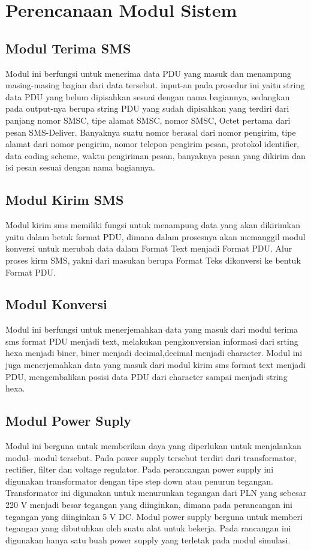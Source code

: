 \section{Perencanaan Modul Sistem}
\subsection{Modul Terima SMS}
Modul ini berfungsi untuk menerima data PDU yang masuk dan menampung masing-masing bagian dari data tersebut.
input-an pada prosedur ini yaitu string data PDU yang belum dipisahkan sesuai dengan nama bagiannya, sedangkan pada output-nya
berupa string PDU yang sudah dipisahkan yang terdiri dari panjang nomor SMSC, tipe alamat
SMSC, nomor SMSC, Octet pertama dari pesan SMS-Deliver. Banyaknya suatu nomor berasal dari nomor pengirim, tipe alamat dari nomor pengirim, nomor telepon pengirim pesan, protokol identifier, data coding scheme, waktu pengiriman pesan, banyaknya
pesan yang dikirim dan isi pesan sesuai dengan nama bagiannya. 
\subsection{Modul Kirim SMS}
Modul kirim sms memiliki fungsi untuk menampung data yang akan dikirimkan yaitu dalam betuk format PDU, dimana dalam prosesnya akan memanggil modul konversi untuk merubah data dalam Format Text menjadi Format PDU. Alur proses kirm SMS, yakni dari masukan berupa Format Teks dikonversi ke bentuk Format PDU. 
\subsection{ Modul Konversi}
Modul ini berfungsi untuk menerjemahkan data yang masuk dari modul terima sms  format PDU menjadi  text,  melakukan pengkonversian informasi dari srting hexa menjadi biner, biner menjadi decimal,decimal menjadi character. Modul ini juga menerjemahkan data yang masuk  dari modul kirim sms format text menjadi PDU, mengembalikan posisi data PDU dari character sampai menjadi string hexa. 
\subsection{Modul Power Suply}
Modul ini berguna untuk memberikan daya yang diperlukan untuk menjalankan modul- modul tersebut. Pada power supply tersebut terdiri dari transformator, rectifier, filter dan voltage regulator. Pada perancangan power supply ini digunakan transformator dengan tipe step down atau penurun tegangan. Transformator ini digunakan untuk menurunkan tegangan dari PLN yang sebesar 220 V menjadi besar tegangan yang diinginkan, dimana pada perancangan ini tegangan yang diinginkan 5 V DC. Modul power supply berguna untuk memberi tegangan yang dibutuhkan oleh suatu alat untuk bekerja. Pada rancangan ini digunakan hanya satu buah power supply yang terletak pada modul simulasi.
